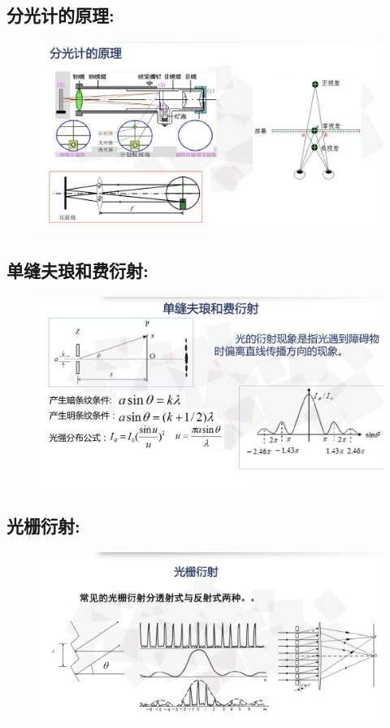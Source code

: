 \documentclass{article}
\begin{document}
\subsection*{分光计的原理:}
\begin{figure}[H]
	\centering
	\includegraphics[width=1\textwidth]{2.png}
	\end{figure}

\subsection*{单缝夫琅和费衍射:}
\begin{figure}[H]
	\centering
	\includegraphics[width=1\textwidth]{3.png}
	\end{figure}

\subsection*{光栅衍射:}
\begin{figure}[H]
	\centering
	\includegraphics[width=1\textwidth]{4.png}
	\end{figure}
\end{document}
